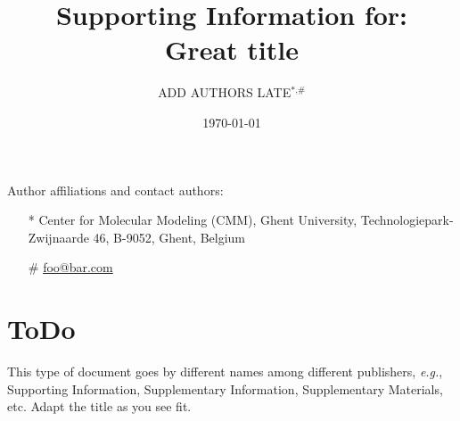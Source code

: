 \documentclass[11pt]{article}
\title{{\normalsize Supporting Information for:}\\[0.5em] Great title}
\author{ADD AUTHORS LATE$^\text{*,\#}$}
\date{\today}
\begin{document}
    \maketitle
    Author affiliations and contact authors:
    \begin{itemize}
        \item[*] Center for Molecular Modeling (CMM), Ghent University, Technologiepark-Zwijnaarde 46, B-9052, Ghent, Belgium
        \item[\#] \href{mailto:foo@bar.com}{foo@bar.com}
    \end{itemize}

    \tableofcontents

    \newpage

    \section{ToDo}
    \label{sec:todo}

    This type of document goes by different names among different publishers,
    \textit{e.g.}, Supporting Information, Supplementary Information, Supplementary Materials, etc.
    Adapt the title as you see fit.
\end{document}
